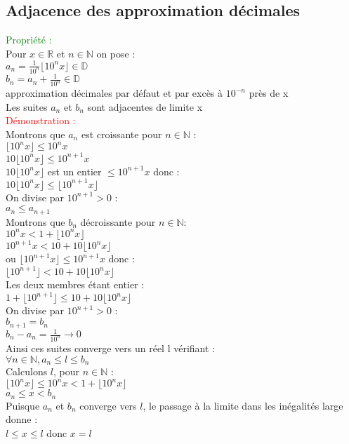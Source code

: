 \documentclass{article}
\begin{document}
\subsection{Adjacence des approximation décimales} 
\textcolor{green}{Propriété :}  \\ 
Pour $x \in \mathbb{R}$ et $n \in \mathbb{N}$ on pose : \\ 
$a_n= \frac{1}{10^n} \lfloor 10^nx \rfloor \in \mathbb{D}$ \\ 
$b_n=a_n+\frac{1}{10^n} \in \mathbb{D}$ \\ 
approximation décimales par défaut et par excès à $10^{-n}$ près de x \\
Les suites $a_n$ et $b_n$ sont adjacentes de limite x \\ 
\textcolor{red}{Démonstration :} \\  
Montrons que $a_n$ est croissante pour $n \in \mathbb{N} $ : \\ 
$\lfloor 10^nx \rfloor \leq 10^nx$ \\ 
$10\lfloor 10^{n}x \rfloor \leq 10^{n+1}x$ \\ 
$10 \lfloor 10^n x \rfloor$ est un entier $\leq10^{n+1}x$ donc : \\ 
$10\lfloor 10^{n}x \rfloor \leq \lfloor10^{n+1}x \rfloor$ \\ 
On divise par $10^{n+1}>0$ : \\ 
$a_n \leq a_{n+1}$ \\ 
Montrons que $b_n$ décroissante pour $n \in \mathbb{N}$: \\ 
$10^{n}x < 1+ \lfloor10^nx \rfloor$ \\ 
$10^{n+1}x < 10+ 10\lfloor10^{n}x \rfloor$ \\ 
ou $ \lfloor 10^{n+1} x \rfloor \leq 10^{n+1}x$ donc : \\ 
$\lfloor 10^{n+1}\rfloor < 10 +10 \lfloor 10^n x \rfloor$ \\ 
Les deux membres étant entier : \\ 
$1+\lfloor 10^{n+1}\rfloor \leq 10 +10 \lfloor 10^n x \rfloor$ \\ 
On divise par $10^{n+1}>0$ : \\ 
$b_{n+1}=b_n$ \\ 
$b_n-a_n= \frac{1}{10^n} \rightarrow 0$ \\ 
Ainsi ces suites converge vers un réel l vérifiant : \\ 
$\forall n \in \mathbb{N}, a_n \leq l \leq b_n$ \\ 
Calculons $l$, pour $n \in \mathbb{N}$ : \\ 
$\lfloor 10^nx \rfloor \leq 10^nx < 1+ \lfloor 10^nx \rfloor$ \\ 
$a_n \leq x <b_n$ \\ 
Puisque $a_n$ et $b_n$ converge vers $l$, le passage à la limite dans les inégalités large donne : \\ 
$l \leq x \leq l$ donc $x=l$
\end{document}

